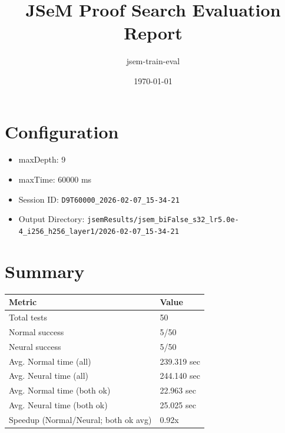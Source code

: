 \documentclass[a4paper,10pt]{article}
\title{JSeM Proof Search Evaluation Report}
\author{jsem-train-eval}
\date{\today}
\begin{document}
\maketitle

\section{Configuration}
\begin{itemize}
\item maxDepth: 9
\item maxTime: 60000 ms
\item Session ID: \texttt{D9T60000\_2026-02-07\_15-34-21}
\item Output Directory: \texttt{jsemResults/jsem\_biFalse\_s32\_lr5.0e-4\_i256\_h256\_layer1/2026-02-07\_15-34-21}
\end{itemize}

\section{Summary}
\begin{tabular}{ll}
\toprule
\textbf{Metric} & \textbf{Value} \\
\midrule
Total tests & 50 \\
Normal success & 5/50 \\
Neural success & 5/50 \\
\midrule
Avg. Normal time (all) & 239.319 sec \\
Avg. Neural time (all) & 244.140 sec \\
Avg. Normal time (both ok) & 22.963 sec \\
Avg. Neural time (both ok) & 25.025 sec \\
Speedup (Normal/Neural; both ok avg) & 0.92x \\
\bottomrule
\end{tabular}
\end{document}
